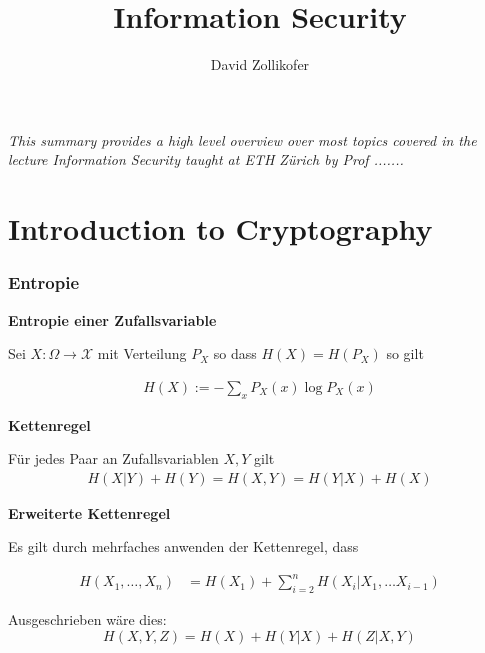 \documentclass[25pt]{sciposter}
\title{\huge{Information Security}}
\author{\large{David Zollikofer}}
\newenvironment{defn}[1]{\begin{mdframed}[backgroundcolor=blue!10,innertopmargin=15pt, nobreak=true,innerbottommargin=15pt]
		\textbf{#1 }
	}
	{ 
	\end{mdframed}
}
\newenvironment{thm}[1]{\begin{mdframed}[nobreak=true,backgroundcolor=Emerald!10,innertopmargin=15pt, innerbottommargin=15pt]
		\textbf{#1 }
	}
	{ 
	\end{mdframed}
}
\begin{document}
	
	
	
	
	
	\maketitle
	
	
	
	\begin{multicols}{3}
		
		
		
		\textit{This summary provides a high level overview over most topics covered in the lecture Information Security taught at ETH Zürich by Prof .......}
		
		\part{Introduction to Cryptography}
		\section{Entropie}
		
	
		
		\begin{defn}{Entropie einer Zufallsvariable}
			Sei $X:\Omega \to \mathcal{X}$ mit Verteilung $P_X$ so dass $H(X) = H(P_X)$ so gilt
			
			\begin{align*}
				H(X) := - \sum_x P_X(x) \log P_X(x)
			\end{align*}
		\end{defn}
		
	
		
		\begin{thm}{Kettenregel}
			Für jedes Paar an Zufallsvariablen $X,Y$ gilt
			\begin{align*}
				H(X|Y) + H(Y) = H(X,Y) = H(Y|X) + H(X)
			\end{align*}
		\end{thm}
		
		\begin{thm}{Erweiterte Kettenregel}
			Es gilt durch mehrfaches anwenden der Kettenregel, dass
			
			\begin{align*}
				H(X_1,\ldots,X_n) &= H(X_1) + \sum_{i=2}^{n} H(X_i | X_1,\ldots X_{i-1})
			\end{align*}
			
			Ausgeschrieben wäre dies:
			$$H(X,Y,Z) = H(X) + H(Y|X) + H(Z|X,Y)$$
		\end{thm}
		

\end{multicols}
\end{document}
